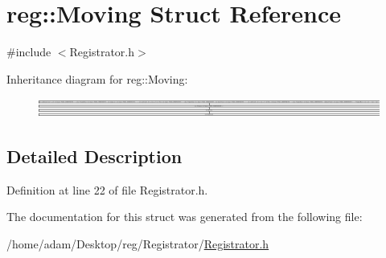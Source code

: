 \hypertarget{structreg_1_1_moving}{}\section{reg\+:\+:Moving Struct Reference}
\label{structreg_1_1_moving}


{\ttfamily \#include $<$Registrator.\+h$>$}

Inheritance diagram for reg\+:\+:Moving\+:\begin{figure}[H]
\begin{center}
\leavevmode
\includegraphics[height=0.625698cm]{structreg_1_1_moving}
\end{center}
\end{figure}


\subsection{Detailed Description}


Definition at line 22 of file Registrator.\+h.



The documentation for this struct was generated from the following file\+:\begin{DoxyCompactItemize}
\item 
/home/adam/\+Desktop/reg/\+Registrator/\hyperlink{_registrator_8h}{Registrator.\+h}\end{DoxyCompactItemize}
